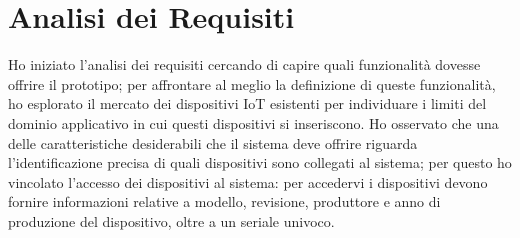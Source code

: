 %



%
%

\newpage

\section{Analisi dei Requisiti}
\label{ar}

Ho iniziato l'analisi dei requisiti cercando di capire quali funzionalità dovesse offrire il prototipo; per affrontare al meglio la definizione di queste funzionalità, ho esplorato il mercato dei dispositivi IoT esistenti per individuare i limiti del dominio applicativo in cui questi dispositivi si inseriscono.
Ho osservato che una delle caratteristiche desiderabili che il sistema deve offrire riguarda l'identificazione precisa di quali dispositivi sono collegati al sistema; per questo ho vincolato l'accesso dei dispositivi al sistema: per accedervi i dispositivi devono fornire informazioni relative a modello, revisione, produttore e anno di produzione del dispositivo, oltre a un seriale univoco.

